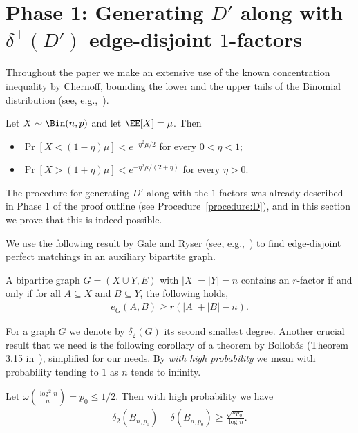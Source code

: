 \documentclass{article}
\begin{document}
	
	\section{\texorpdfstring{Phase 1: Generating $D'$ along with $\delta^{\pm}(D')$ edge-disjoint $1$-factors}{Phase 1: Generating D' along with delta(D') edge-disjoint 1-factors}}
	
	Throughout the paper we make an extensive use of the known concentration inequality by Chernoff, bounding the lower and the upper tails of the Binomial distribution (see, e.g.,~\cites{AlonSpencer,JRLrandomgraphs}).
	\begin{theorem}
		\label{Chernoff}
		Let $X\sim \Bin(n, p)$ and let $\EE[X] = \mu$.
		Then
		\begin{itemize}
			\item $\Pr[X < (1-\eta)\mu]<e^{-\eta^2\mu/2}$ for every $0 < \eta < 1$;
			\item $\Pr[X>(1+\eta)\mu] < e^{-\eta^2\mu/(2+\eta)}$ for every $\eta > 0$.
		\end{itemize}
	\end{theorem}
	
	
	The procedure for generating $D'$ along with the $1$-factors was already described in Phase 1 of the proof outline (see Procedure~\ref{procedure:D}), and in this section we prove that this is indeed possible.
	
	We use the following result by Gale and Ryser (see, e.g.,~\cite{lovasz2007combinatorial}) to find edge-disjoint perfect matchings in an auxiliary bipartite graph.
	\begin{theorem}
		\label{lem:GaleRyser}
		A bipartite graph $G = (X \cup Y, E)$ with $|X| = |Y| = n$ contains an $r$-factor if and only if for all $A \subseteq X$ and $B \subseteq Y$, the following holds,
		\begin{align}
		\label{eq:GaleRyser}
		e_G(A, B) \ge r\left(|A| + |B| - n \right).
		\end{align}
	\end{theorem}
	
	For a graph $G$ we denote by $\delta_2(G)$ its second smallest degree.
	Another crucial result that we need is the following corollary of a theorem by Bollob\'{a}s (Theorem 3.15 in~\cite{bollobas1998random}), simplified for our needs.
	By \emph{with high probability} we mean with probability tending to $1$ as $n$ tends to infinity.
	\begin{theorem}
		\label{thm:DegGap}
		Let $\omega\left(\frac{\log^2 n}{n}\right)= p_0 \leq 1/2$.
		Then with high probability we have
		\begin{align*}
		\delta_2(B_{n,p_0}) - \delta(B_{n,p_0}) \ge \frac{\sqrt{np_0}}{\log n}.
		\end{align*}
	\end{theorem}
	
\end{document}
